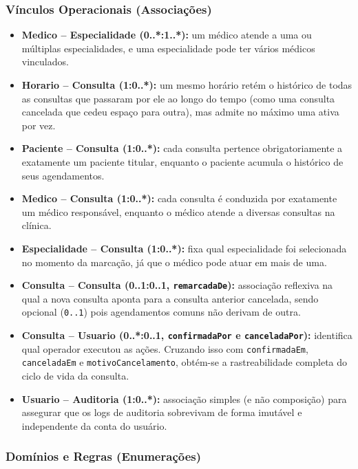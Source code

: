 \documentclass[12pt,a4paper]{article}
\providecommand{\tightlist}{%
  \setlength{\itemsep}{0pt}\setlength{\parskip}{0pt}}
\begin{document}
\subsubsection*{Vínculos Operacionais (Associações)}

\begin{itemize}
\tightlist
\item
  \textbf{Medico -- Especialidade (0..*:1..*):} um médico atende a uma ou
  múltiplas especialidades, e uma especialidade pode ter vários médicos
  vinculados.
\item
  \textbf{Horario -- Consulta (1:0..*):} um mesmo horário retém o
  histórico de todas as consultas que passaram por ele ao longo do tempo
  (como uma consulta cancelada que cedeu espaço para outra), mas admite no
  máximo uma ativa por vez.
\item
  \textbf{Paciente -- Consulta (1:0..*):} cada consulta pertence
  obrigatoriamente a exatamente um paciente titular, enquanto o paciente
  acumula o histórico de seus agendamentos.
\item
  \textbf{Medico -- Consulta (1:0..*):} cada consulta é conduzida por
  exatamente um médico responsável, enquanto o médico atende a diversas
  consultas na clínica.
\item
  \textbf{Especialidade -- Consulta (1:0..*):} fixa qual especialidade foi
  selecionada no momento da marcação, já que o médico pode atuar em mais
  de uma.
\item
  \textbf{Consulta -- Consulta (0..1:0..1, \texttt{remarcadaDe}):}
  associação reflexiva na qual a nova consulta aponta para a consulta
  anterior cancelada, sendo opcional (\texttt{0..1}) pois agendamentos
  comuns não derivam de outra.
\item
  \textbf{Consulta -- Usuario (0..*:0..1, \texttt{confirmadaPor} e
  \texttt{canceladaPor}):} identifica qual operador executou as ações.
  Cruzando isso com \texttt{confirmadaEm}, \texttt{canceladaEm} e
  \texttt{motivoCancelamento}, obtém-se a rastreabilidade completa do
  ciclo de vida da consulta.
\item
  \textbf{Usuario -- Auditoria (1:0..*):} associação simples (e não
  composição) para assegurar que os logs de auditoria sobrevivam de forma
  imutável e independente da conta do usuário.
\end{itemize}

\subsubsection*{Domínios e Regras (Enumerações)}
\end{document}
